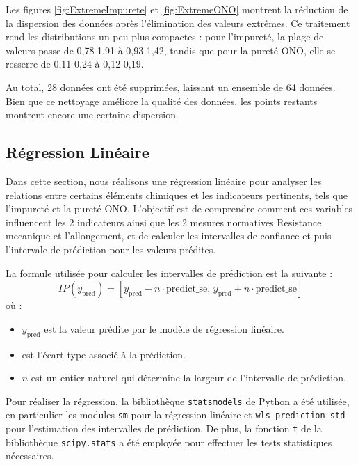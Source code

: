 \documentclass[12pt]{article}
\begin{document}
Les figures \ref{fig:ExtremeImpurete} et \ref{fig:ExtremeONO} 
montrent la réduction de la dispersion des données après 
l'élimination des valeurs extrêmes. Ce traitement rend les distributions 
un peu plus compactes : pour l'impureté, la plage de valeurs passe 
de 0,78-1,91 à 0,93-1,42, tandis que pour la pureté ONO, elle se 
resserre de 0,11-0,24 à 0,12-0,19.

Au total, 28 données ont été supprimées, laissant un ensemble de 
64 données. Bien que ce nettoyage améliore la qualité des données, les 
points restants montrent encore une certaine dispersion. 






\subsection{Régression Linéaire}



Dans cette section, nous réalisons une régression linéaire pour analyser 
les relations entre certains éléments chimiques et les indicateurs 
pertinents, tels que l'impureté et la pureté ONO. L'objectif est de 
comprendre comment ces variables influencent les 2 indicateurs ainsi que 
les 2 mesures normatives Resistance mecanique et l'allongement, 
et de calculer les intervalles  de confiance et puis l'intervale 
de prédiction pour les valeurs prédites.

\medskip %

La formule utilisée pour calculer les intervalles de prédiction est la suivante :
$$
IP (y_{\text{pred}}) = [y_{\text{pred}} - n \cdot \text{predict\_se}, \, y_{\text{pred}} + n \cdot \text{predict\_se}]
$$
où :
\begin{itemize}
    \item $y_{\text{pred}}$ est la valeur prédite par le modèle de 
    régression linéaire.
    \item {} est l'écart-type associé à la prédiction.
    \item $n$ est un entier naturel qui détermine la largeur de 
    l'intervalle de prédiction.
\end{itemize}


Pour réaliser la régression, la bibliothèque \texttt{statsmodels} de 
Python a été utilisée, en particulier les modules \texttt{sm} pour la 
régression linéaire et \texttt{wls\_prediction\_std} pour l'estimation des 
intervalles de prédiction. De plus, la fonction \texttt{t} de la 
bibliothèque \texttt{scipy.stats} a été employée pour effectuer les 
tests statistiques nécessaires.
\end{document}
